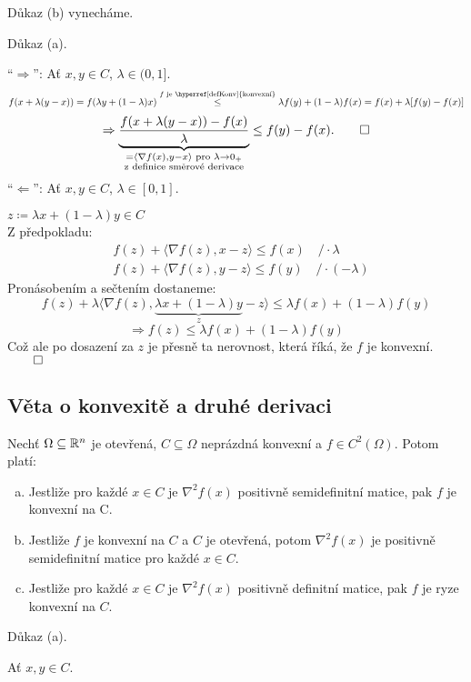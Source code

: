 Důkaz (b) vynecháme.

Důkaz (a).

\enquote{$\Rightarrow$}: Ať $x, y \in C$, $\lambda \in (0,1]$.
\[
    f(x + \lambda (y-x)) = f(\lambda y + (1-\lambda)x) \overset{f \text{ je \hyperref[defKonv]{konvexní}}}{\leq}
    \lambda f(y) + (1 - \lambda)f(x) = f(x) + \lambda [f(y) - f(x)]
\]
\[
    \Rightarrow \underbrace {\frac {f(x + \lambda (y-x)) - f(x)}{\lambda}}_{\substack{{ = \langle \nabla f(x),
    y-x\rangle \text{ pro } \lambda \rightarrow 0_+}\\{\text{z definice směrové derivace}}}} \leq f(y) - f(x). \qed
\]
\enquote{$\Leftarrow$}: Ať $x, y \in C$, $\lambda \in [0,1]$.

$z \coloneq \lambda x + (1-\lambda) y \in C$\\
Z předpokladu:
\begin{align*}
    & f(z) + \langle \nabla f(z), x - z\rangle \leq f(x) \quad / \cdot \lambda \\
    & f(z) + \langle \nabla f(z), y - z\rangle \leq f(y) \quad / \cdot (- \lambda)
\end{align*}
Pronásobením a sečtením dostaneme:
\[
    f(z) + \lambda \langle \nabla f(z), \underbrace{\lambda x + (1-\lambda)y}_{z} - z\rangle \leq \lambda f(x) +
    (1-\lambda)f(y)
\]
\[
    \Rightarrow f(z) \leq \lambda f(x) + (1-\lambda)f(y)
\]
Což ale po dosazení za $z$ je přesně ta nerovnost, která říká, že $f$ je konvexní. $\qed$

\subsection{Věta o konvexitě a druhé derivaci}\label{konvDDeriv}
Nechť $\Omega \subseteq \mathbb{R}^n$ je otevřená, $C \subseteq \Omega$ neprázdná konvexní a $f \in C^{2} (\Omega)$. Potom platí:
\begin{enumerate}[(a)]
    \item Jestliže pro každé $x \in C$ je $\nabla^2 f(x)$ positivně semidefinitní matice, pak $f$ je konvexní na C.
    \item Jestliže $f$ je konvexní na $C$ a $C$ je otevřená, potom $\nabla^2 f(x)$ je positivně semidefinitní matice pro
    každé $x \in C$.
    \item Jestliže pro každé $x \in C$ je $\nabla^2 f(x)$ positivně definitní matice, pak $f$ je ryze konvexní na $C$.
\end{enumerate}

Důkaz (a).

Ať $x, y \in C$.

